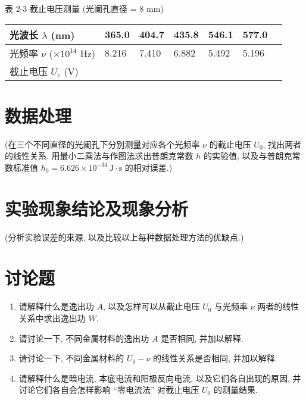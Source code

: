 \documentclass[signature=preparation]{physicsreport}
\begin{document}
{\small\selectfont \centering 表 2-3 截止电压测量 (光阑孔直径 = 8 mm) \par}
\begin{table*}[ht]
    \renewcommand{\arraystretch}{1.4}
    \small\selectfont
    \centering
    \begin{tabularx}{\textwidth}{|l|Y|Y|Y|Y|Y|Y|} \hline
        光波长 $\lambda$ (nm)              & 365.0 & 404.7 & 435.8 & 546.1 & 577.0 \\\hline
        光频率 $\nu$ ($\times 10^{14}$ Hz) & 8.216 & 7.410 & 6.882 & 5.492 & 5.196 \\\hline
        截止电压 $U_c$ (V)                  &       &       &       &       &       \\\hline
    \end{tabularx}
\end{table*}

\normalsize\selectfont

\makeatletter
{}
\makeatother

\newpage
\section{数据处理}
\hspace*{\parindent} (在三个不同直径的光阑孔下分别测量对应各个光频率 $\nu$ 的截止电压 $U_0$, 找出两者的线性关系. 用最小二乘法与作图法求出普朗克常数 $h$ 的实验值, 以及与普朗克常数标准值 $h_0=6.626\times 10^{-34}\ \mathrm{J\cdot s}$ 的相对误差.)

\newpage
\section{实验现象结论及现象分析}
\hspace*{\parindent} (分析实验误差的来源, 以及比较以上每种数据处理方法的优缺点.)

\newpage
\section{讨论题}
\begin{enumerate}
    \item 请解释什么是逸出功 $A$, 以及怎样可以从截止电压 $U_0$ 与光频率 $\nu$ 两者的线性关系中求出逸出功 $W$.
    \item 请讨论一下, 不同金属材料的逸出功 $A$ 是否相同, 并加以解释.
    \item 请讨论一下, 不同金属材料的 $U_0-\nu$ 的线性关系是否相同, 并加以解释.
    \item 请解释什么是暗电流, 本底电流和阳极反向电流, 以及它们各自出现的原因, 并讨论它们各自会怎样影响 ``零电流法'' 对截止电压 $U_0$ 的测量结果.
\end{enumerate}
\end{document}
